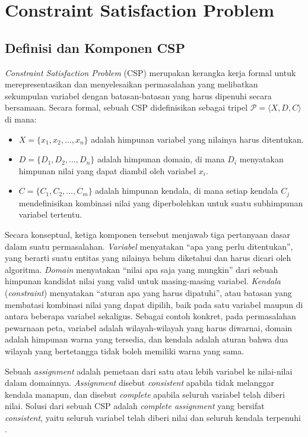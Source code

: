 \section{Constraint Satisfaction Problem}
\label{sec:csp}

\subsection{Definisi dan Komponen CSP}
\label{subsec:csp-definisi}
\textit{Constraint Satisfaction Problem} (CSP) merupakan kerangka kerja formal untuk merepresentasikan dan menyelesaikan permasalahan yang melibatkan sekumpulan variabel dengan batasan-batasan yang harus dipenuhi secara bersamaan. Secara formal, sebuah CSP didefinisikan sebagai tripel $\mathcal{P} = \langle X, D, C \rangle$ \cite{russell2020artificial} di mana:

\begin{itemize}
	\item $X = \{x_1, x_2, \dots, x_n\}$ adalah himpunan variabel yang nilainya harus ditentukan.
	\item $D = \{D_1, D_2, \dots, D_n\}$ adalah himpunan domain, di mana $D_i$ menyatakan himpunan nilai yang dapat diambil oleh variabel $x_i$.
	\item $C = \{C_1, C_2, \dots, C_m\}$ adalah himpunan kendala, di mana setiap kendala $C_j$ mendefinisikan kombinasi nilai yang diperbolehkan untuk suatu subhimpunan variabel tertentu.
\end{itemize}

Secara konseptual, ketiga komponen tersebut menjawab tiga pertanyaan dasar dalam suatu permasalahan. \textit{Variabel} menyatakan ``apa yang perlu ditentukan'', yang berarti suatu entitas yang nilainya belum diketahui dan harus dicari oleh algoritma. \textit{Domain} menyatakan ``nilai apa saja yang mungkin'' dari sebuah himpunan kandidat nilai yang valid untuk masing-masing variabel. \textit{Kendala} (\textit{constraint}) menyatakan ``aturan apa yang harus dipatuhi'', atau batasan yang membatasi kombinasi nilai yang dapat dipilih, baik pada satu variabel maupun di antara beberapa variabel sekaligus. Sebagai contoh konkret, pada permasalahan pewarnaan peta, variabel adalah wilayah-wilayah yang harus diwarnai, domain adalah himpunan warna yang tersedia, dan kendala adalah aturan bahwa dua wilayah yang bertetangga tidak boleh memiliki warna yang sama.

Sebuah \textit{assignment} adalah pemetaan dari satu atau lebih variabel ke nilai-nilai dalam domainnya. \textit{Assignment} disebut \textit{consistent} apabila tidak melanggar kendala manapun, dan disebut \textit{complete} apabila seluruh variabel telah diberi nilai. Solusi dari sebuah CSP adalah \textit{complete assignment} yang bersifat \textit{consistent}, yaitu seluruh variabel telah diberi nilai dan seluruh kendala terpenuhi \cite{russell2020artificial}.

